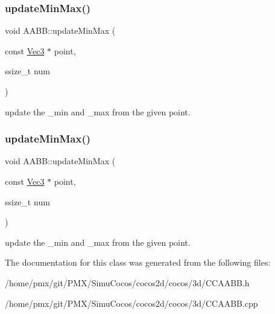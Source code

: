 \subsubsection{\texorpdfstring{update\+Min\+Max()}{updateMinMax()}\hspace{0.1cm}{\footnotesize\ttfamily [1/2]}}
{\footnotesize\ttfamily void A\+A\+B\+B\+::update\+Min\+Max (\begin{DoxyParamCaption}\item[{const \hyperlink{classVec3}{Vec3} $\ast$}]{point,  }\item[{ssize\+\_\+t}]{num }\end{DoxyParamCaption})}

update the \+\_\+min and \+\_\+max from the given point. \mbox{\label{classAABB_a08f4e4ad7a09b30f79ab80a0c6056ede}} 
\subsubsection{\texorpdfstring{update\+Min\+Max()}{updateMinMax()}\hspace{0.1cm}{\footnotesize\ttfamily [2/2]}}
{\footnotesize\ttfamily void A\+A\+B\+B\+::update\+Min\+Max (\begin{DoxyParamCaption}\item[{const \hyperlink{classVec3}{Vec3} $\ast$}]{point,  }\item[{ssize\+\_\+t}]{num }\end{DoxyParamCaption})}

update the \+\_\+min and \+\_\+max from the given point. 

The documentation for this class was generated from the following files\+:\begin{DoxyCompactItemize}
\item 
/home/pmx/git/\+P\+M\+X/\+Simu\+Cocos/cocos2d/cocos/3d/C\+C\+A\+A\+B\+B.\+h\item 
/home/pmx/git/\+P\+M\+X/\+Simu\+Cocos/cocos2d/cocos/3d/C\+C\+A\+A\+B\+B.\+cpp\end{DoxyCompactItemize}
